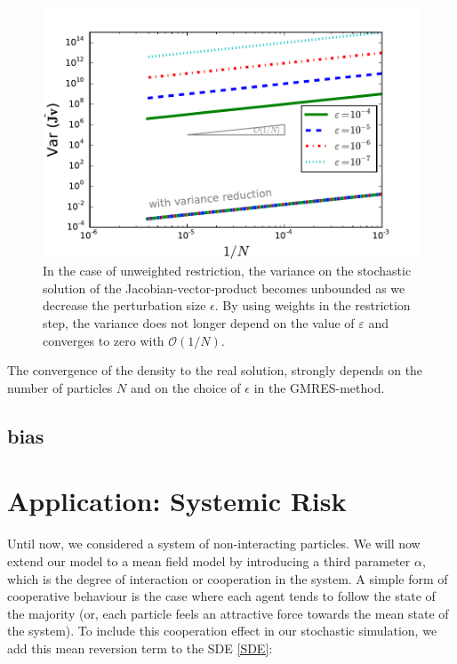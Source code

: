 \documentclass[]{article}
\theoremstyle{definition}
\begin{document}
\begin{figure}
\centering
\includegraphics[width=0.8\linewidth]{../Problems/Particles/checkSystem/plots/Var_N_eps_nw}
\caption[Effect of variance reduction]{In the case of unweighted restriction, the variance on the stochastic solution of the Jacobian-vector-product becomes unbounded as we decrease the perturbation size $\epsilon$. By using weights in the restriction step, the variance does not longer depend on the value of $\varepsilon$ and   converges to zero with $\mathcal{O}(1/ N)$.}
\label{Var_N}
\end{figure}

%


The convergence of the density to the real solution, strongly depends on the number of particles $N$ and on the choice of $\epsilon$ in the GMRES-method. 



\subsection{}



\subsection{bias}


\section{Application: Systemic Risk}


Until now, we considered a system of non-interacting particles. We will now extend our model to a mean field model by introducing a third parameter $\alpha$, which is the degree of interaction or cooperation in the system. A simple form of cooperative behaviour is the case where each agent tends to follow the state of the majority (or, each particle feels an attractive force towards the mean state of the system). To include this cooperation effect in our stochastic simulation, we add this mean reversion term to the SDE \eqref{SDE}:
\end{document}

